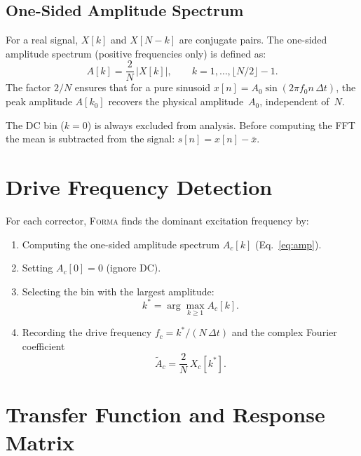 \documentclass[11pt,a4paper,twoside]{report}
\newcommand{\forma}{\textsc{Forma}}
\begin{document}
\subsection{One-Sided Amplitude Spectrum}

For a real signal, $X[k]$ and $X[N{-}k]$ are conjugate pairs. The one-sided amplitude spectrum (positive frequencies only) is defined as:
\begin{equation}\label{eq:amp}
  A[k] = \frac{2}{N}\,\lvert X[k]\rvert,
  \qquad k=1,\dots,\lfloor N/2\rfloor - 1.
\end{equation}
The factor $2/N$ ensures that for a pure sinusoid $x[n]=A_0\sin(2\pi f_0 n\,\Delta t)$, the peak amplitude $A[k_0]$ recovers the physical amplitude~$A_0$, independent of~$N$.

\begin{notebox}[DC Component]
The DC bin ($k{=}0$) is always excluded from analysis. Before computing the FFT the mean is subtracted from the signal: $s[n] = x[n] - \bar{x}$.
\end{notebox}

\section{Drive Frequency Detection}\label{sec:freqdetect}

For each corrector, \forma{} finds the dominant excitation frequency by:
\begin{enumerate}
  \item Computing the one-sided amplitude spectrum $A_c[k]$ (Eq.~\ref{eq:amp}).
  \item Setting $A_c[0]=0$ (ignore DC).
  \item Selecting the bin with the largest amplitude:
    \begin{equation}\label{eq:peakbin}
      k^{*} = \arg\max_{k\ge1} A_c[k].
    \end{equation}
  \item Recording the drive frequency $f_c = k^{*}/(N\,\Delta t)$ and the complex Fourier coefficient
    \begin{equation}
      \tilde{A}_c = \frac{2}{N}\,X_c[k^{*}].
    \end{equation}
\end{enumerate}

\section{Transfer Function and Response Matrix}\label{sec:transfer}
\end{document}
